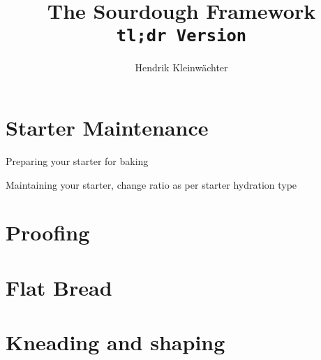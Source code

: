 \documentclass[draft, landscape, paper=a4, twoside=false,
                fontsize=12pt]{scrbook}
\author{Hendrik Kleinwächter}
\title{The Sourdough Framework\\\texttt{tl;dr Version}}
\begin{document}
\maketitle

\section*{Starter Maintenance}
\begin{flowchart}[!htb]

\caption*{Preparing your starter for baking}
\end{flowchart}

\begin{flowchart}[!htb]

\caption*{Maintaining your starter, change ratio as per starter hydration type}
\end{flowchart}

\clearpage{}
\section*{Proofing}

\begin{flowchart}[!htb]

\end{flowchart}

\begin{flowchart}[!htb]

\end{flowchart}

\clearpage{}

\section*{Flat Bread}
\begin{Parallel}[v]{0.48\textwidth}{0.48\textwidth}
\ParallelLText{\noindent

}
\end{Parallel}

\section*{Kneading and shaping}
\begin{flowchart}[!htb]

\end{flowchart}

\begin{flowchart}[!htb]

\end{flowchart}
\clearpage{}
\end{document}
